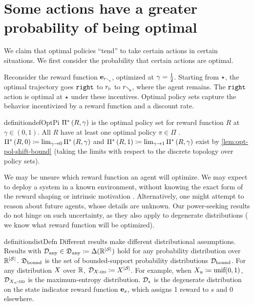 \section{Some actions have a greater probability of being optimal}\label{sec:action-prob}
We claim that optimal policies ``tend'' to take certain actions in certain situations. We first consider the probability that certain actions are optimal.

Reconsider the reward function $\unitvec[\farright]$, optimized at $\gamma=\half$. Starting from $\start$, the optimal trajectory goes $\rightA$ to $\closeright$ to $\farright$, where the agent remains. The $\rightA$ action is optimal at $\start$ under these incentives. Optimal policy sets capture the behavior incentivized by a reward function and a discount rate.

\begin{restatable}{definition}{defOptPi}\label{def:opt-fn}
$\optPi$ is the optimal policy set for reward function $R$ at $\gamma\in(0,1)$. All $R$ have at least one optimal policy $\pi\in\Pi$ \citep{puterman_markov_2014}. $\optPi[R,0]\defeq \lim_{\gamma\to 0} \optPi$ and $\optPi[R,1]\defeq \lim_{\gamma\to 1} \optPi$ exist by \cref{lem:opt-pol-shift-bound} (taking the limits with respect to the discrete topology over policy sets).
\end{restatable} 

We may be unsure which reward function an agent will optimize. We may expect to deploy a system in a known environment, without knowing the exact form of \eg{} the reward shaping \citep{Ng99policyinvariance} or intrinsic motivation \citep{pathakICMl17curiosity}. Alternatively, one might attempt to reason about future {\rl} agents, whose details are unknown. Our power-seeking results do not hinge on such uncertainty, as they also apply to degenerate distributions (\ie{} we know what reward function will be optimized). 

\begin{restatable}{definition}{distDefn}\label{def:dist}
Different results make different distributional assumptions. Results with $\Dany \in \DSetAny\defeq \Delta(\rewardVS)$ hold for any probability distribution over $\rewardVS$. $\DSetBd$ is the set of bounded-support probability distributions $\Dbd$. For any distribution $\Dist$ over $\reals$, $\Diid\defeq \Dist^{\abs{\St}}$.  For example, when $\Dist_u\defeq \text{unif}(0,1)$, $\Diid[\Dist_u]$ is the maximum-entropy distribution. $\D_s$ is the degenerate distribution on the state indicator reward function $\unitvec$, which assigns 1 reward to $s$ and 0 elsewhere.
\end{restatable} 

